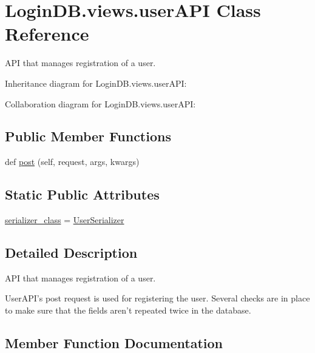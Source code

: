 \hypertarget{class_login_d_b_1_1views_1_1user_a_p_i}{}\section{Login\+D\+B.\+views.\+user\+A\+PI Class Reference}
\label{class_login_d_b_1_1views_1_1user_a_p_i}


A\+PI that manages registration of a user.  




Inheritance diagram for Login\+D\+B.\+views.\+user\+A\+PI\+:


Collaboration diagram for Login\+D\+B.\+views.\+user\+A\+PI\+:
\subsection*{Public Member Functions}
\begin{DoxyCompactItemize}
\item 
def \hyperlink{class_login_d_b_1_1views_1_1user_a_p_i_a02b7a78020babdbc78ca643b9c910e55}{post} (self, request, args, kwargs)
\end{DoxyCompactItemize}
\subsection*{Static Public Attributes}
\begin{DoxyCompactItemize}
\item 
\hyperlink{class_login_d_b_1_1views_1_1user_a_p_i_a36df7af9befe6a85192da7694a68c0e2}{serializer\+\_\+class} = \hyperlink{class_login_d_b_1_1serializers_1_1_user_serializer}{User\+Serializer}
\end{DoxyCompactItemize}


\subsection{Detailed Description}
A\+PI that manages registration of a user. 

\begin{DoxyVerb}UserAPI's post request is used for registering the user.
Several checks are in place to make sure that the fields aren't repeated twice in the database.
\end{DoxyVerb}
 

\subsection{Member Function Documentation}
\mbox{\label{class_login_d_b_1_1views_1_1user_a_p_i_a02b7a78020babdbc78ca643b9c910e55}} 
